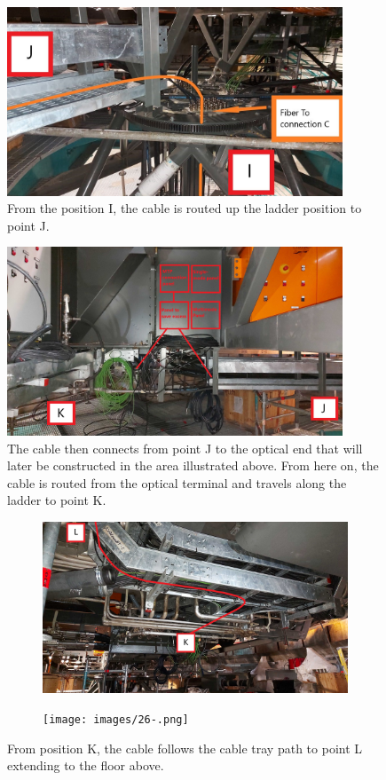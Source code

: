   \begin{figure}
    \centering
    \includegraphics[width=10cm]{images/23.jpg}
    \caption*{From the position I, the cable is routed up the ladder position to point J.}
  \end{figure}
  \begin{figure}
    \centering
    \includegraphics[width=10cm]{images/24.jpg}
    \caption*{The cable then connects from point J to the optical end that will later be constructed in the area illustrated above. From here on, the cable is routed from the optical terminal and travels along the ladder to point K.}
  \end{figure}

\newpage

  \begin{figure}
    \centering
    \begin{subfigure}{0.60\textwidth}
      \centering
      \includegraphics[width=\textwidth]{images/25.jpg}
    \end{subfigure}
    \hfill
    \begin{subfigure}{0.40\textwidth}
      \centering
      \texttt{[image: images/26-.png]}
    \end{subfigure}
    \caption*{From position K, the cable follows the cable tray path to point L extending to the floor above.}
  \end{figure}

